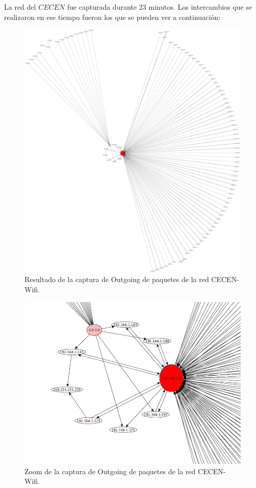 \documentclass[10pt, a4paper]{article}
\begin{document}
La red del $CECEN$ fue capturada durante 23 minutos. Los intercambios que se realizaron en ese tiempo fueron los que se pueden ver a continuación:
\begin{figure}[H] %
\begin{center}
\includegraphics[width=450pt]{../imgs/cecen-outgoing.png}
\caption{Resultado de la captura de Outgoing de paquetes de la red CECEN-Wifi.}
\end{center}
\end{figure}

\begin{figure}[H] %
\begin{center}
\includegraphics[width=400pt]{../imgs/zoom-cecen-outgoing.png}
\caption{Zoom de la captura de Outgoing de paquetes de la red CECEN-Wifi.}
\end{center}
\end{figure}
\end{document}
